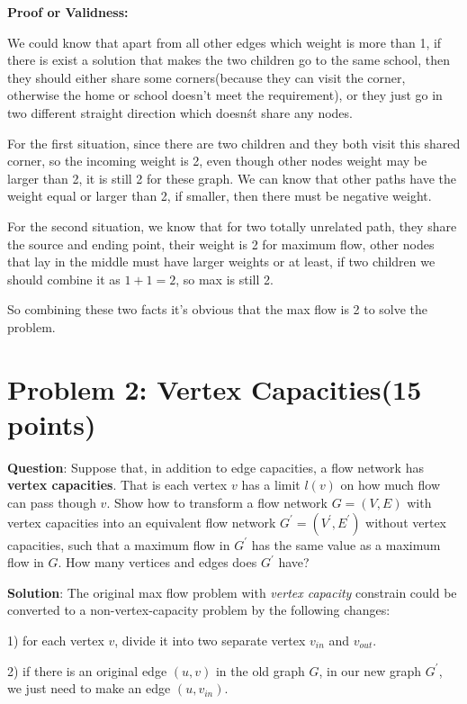 \documentclass{article}
\begin{document}
\textbf{Proof or Validness:}

We could know that apart from all other edges which weight is more than 1, if there is exist a solution that makes the
two children go to the same school, then they should either share some corners(because they can visit the corner, otherwise the home or school doesn't meet the requirement), or they just go in two different straight direction which
doesn\'st share any nodes.

For the first situation, since there are two children and they both visit this shared corner, so the incoming weight is
2, even though other nodes weight may be larger than 2, it is still 2 for these graph. We can know that other paths have
the weight equal or larger than 2, if smaller, then there must be negative weight.

For the second situation, we know that for two totally unrelated path, they share the source and ending point, their weight is 2 for maximum flow, other nodes that lay in the middle must have larger weights or at least, if two children we should combine it as $ 1 + 1 = 2 $, so max is still 2. 

So combining these two facts it's obvious that the max flow is 2 to solve the problem.

\section{Problem 2: Vertex Capacities(15 points)}
\textbf{Question}: Suppose that, in addition to edge capacities, a flow network has \textbf{vertex capacities}. That is each vertex $v$ has a limit $l(v)$ on how much flow can pass though $v$. Show how to transform a flow network $G=(V, E)$ with vertex capacities into an equivalent flow network $G^{'} = (V^{'},  E^{'})$ without vertex capacities, such that a maximum flow in $G^{'}$ has the same value as a maximum flow in $G$. How many vertices and edges does $G^{'}$ have?\newline

\textbf{Solution}: The original max flow problem with \textsl{vertex capacity} constrain could be converted to a non-vertex-capacity problem by the following changes:

1) for each vertex $v$, divide it into two separate vertex $v_{in}$ and $v_{out}$.

2) if there is an original edge $(u, v)$ in the old graph $G$, in our new graph $G^{'}$, we just need to make an
edge $(u, v_{in})$.
\end{document}
